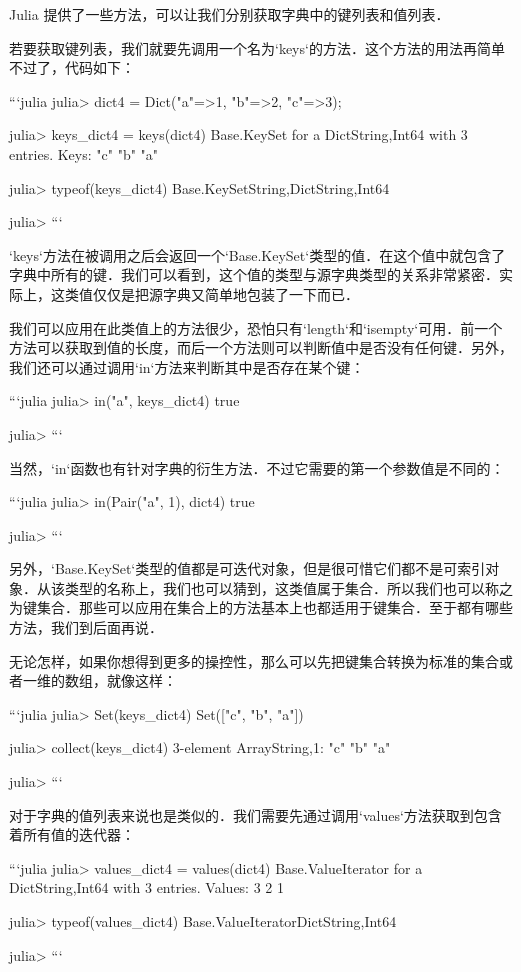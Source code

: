 Julia 提供了一些方法，可以让我们分别获取字典中的键列表和值列表．

若要获取键列表，我们就要先调用一个名为`keys`的方法．这个方法的用法再简单不过了，代码如下：

```julia
julia> dict4 = Dict("a"=>1, "b"=>2, "c"=>3);

julia> keys_dict4 = keys(dict4)
Base.KeySet for a Dict{String,Int64} with 3 entries. Keys:
  "c"
  "b"
  "a"

julia> typeof(keys_dict4)
Base.KeySet{String,Dict{String,Int64}}

julia> 
```

`keys`方法在被调用之后会返回一个`Base.KeySet`类型的值．在这个值中就包含了字典中所有的键．我们可以看到，这个值的类型与源字典类型的关系非常紧密．实际上，这类值仅仅是把源字典又简单地包装了一下而已．

我们可以应用在此类值上的方法很少，恐怕只有`length`和`isempty`可用．前一个方法可以获取到值的长度，而后一个方法则可以判断值中是否没有任何键．另外，我们还可以通过调用`in`方法来判断其中是否存在某个键：

```julia
julia> in("a", keys_dict4)
true

julia> 
```

当然，`in`函数也有针对字典的衍生方法．不过它需要的第一个参数值是不同的：

```julia
julia> in(Pair("a", 1), dict4)
true

julia> 
```

另外，`Base.KeySet`类型的值都是可迭代对象，但是很可惜它们都不是可索引对象．从该类型的名称上，我们也可以猜到，这类值属于集合．所以我们也可以称之为键集合．那些可以应用在集合上的方法基本上也都适用于键集合．至于都有哪些方法，我们到后面再说．

无论怎样，如果你想得到更多的操控性，那么可以先把键集合转换为标准的集合或者一维的数组，就像这样：

```julia
julia> Set(keys_dict4)
Set(["c", "b", "a"])

julia> collect(keys_dict4)
3-element Array{String,1}:
 "c"
 "b"
 "a"

julia> 
```

对于字典的值列表来说也是类似的．我们需要先通过调用`values`方法获取到包含着所有值的迭代器：

```julia
julia> values_dict4 = values(dict4)
Base.ValueIterator for a Dict{String,Int64} with 3 entries. Values:
  3
  2
  1

julia> typeof(values_dict4)
Base.ValueIterator{Dict{String,Int64}}

julia> 
```

